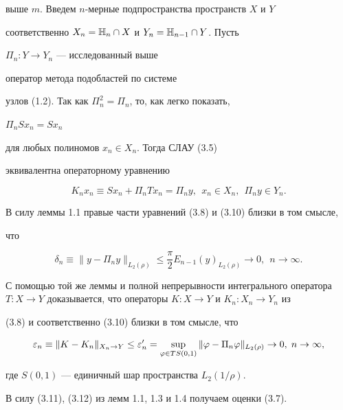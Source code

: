 \begin{pf}
выше $m$. Введем $n$-мерные подпространства пространств $X$ и $Y$


соответственно $X_n=\Bbb H_n\cap X$ и $Y_n=\Bbb H_{n-1}\cap Y$. Пусть


$\Pi_n:Y\to Y_n$ --- исследованный выше


оператор метода подобластей по системе


узлов (1.2). Так как $\Pi_n^2=\Pi_n$, то, как легко показать,


$\Pi_nSx_n=Sx_n$


для любых полиномов $x_n\in X_n$. Тогда СЛАУ (3.5)


эквивалентна операторному уравнению


\begin{equation}


K_nx_n\equiv Sx_n+\Pi_nTx_n=\Pi_ny,\ \ x_n\in X_n,\ \ \Pi_ny\in Y_n.


\end{equation}





В силу леммы 1.1 правые части уравнений (3.8) и (3.10) близки в том смысле,


что


\begin{equation}


\delta_n \equiv \|y-\Pi_ny\|_{L_2(\rho)}\le


\frac{\pi}{2}E_{n-1}(y)_{L_2(\rho)}\to 0,\ \ n\to \infty.


\end{equation}


С помощью той же леммы и полной непрерывности интегрального оператора $T:


X\to Y$ доказывается, что операторы $K:X\to Y$ и $K_n:X_n\to Y_n$ из


(3.8) и соответственно (3.10) близки в том смысле, что


\begin{equation}


\ve_n\equiv \|K-K_n\|_{X_n\to Y}\le \ve'_n=\sup_{\vp\in TS(0,1)}


\|\vp-\Pi_n\vp\|_{L_2(\rho)}\to 0,\; n\to \infty,


\end{equation}


где $S(0,1)$ --- единичный шар пространства $L_2(1/\rho)$.


В силу (3.11), (3.12) из лемм 1.1, 1.3 и 1.4 получаем оценки (3.7).


\end{pf}





